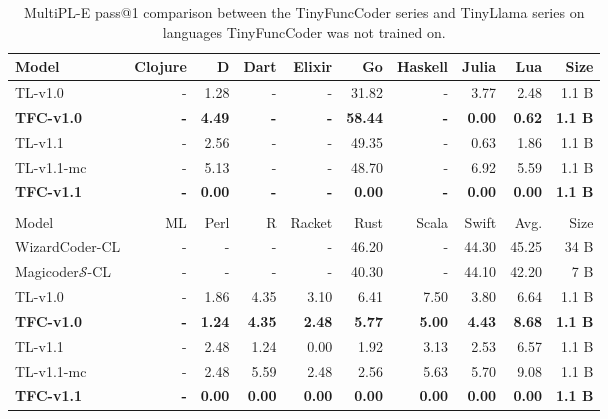 \begin{table}[!h]
    \centering
    \small
    \caption{MultiPL-E pass@1 comparison between the TinyFuncCoder series and TinyLlama series on languages TinyFuncCoder was not trained on.}
    \begin{tabular}{l|rrrrrrrr|r}
        \hline
        Model & Clojure & D & Dart & Elixir & Go & Haskell & Julia & Lua & Size \\
        \hline
        TL-v1.0 & - & 1.28 & - & - & 31.82 & - & 3.77 & 2.48 & 1.1 B\\
        \textbf{TFC-v1.0} & \textbf{-} & \textbf{4.49} & \textbf{-} & \textbf{-} & \textbf{58.44} & \textbf{-} & \textbf{0.00} & \textbf{0.62} & \textbf{1.1 B} \\
        TL-v1.1 & - & 2.56 & - & - & 49.35 & - & 0.63 & 1.86 & 1.1 B \\
        TL-v1.1-mc & - & 5.13 & - & - & 48.70 & - & 6.92 & 5.59 & 1.1 B \\
        \textbf{TFC-v1.1} & \textbf{-} & \textbf{0.00} & \textbf{-} & \textbf{-} & \textbf{0.00} & \textbf{-} & \textbf{0.00} & \textbf{0.00} & \textbf{1.1 B} \\
        &&&&&&&&\\
        \hline
        Model & ML & Perl & R & Racket & Rust & Scala & Swift & Avg. & Size \\
        \hline
        WizardCoder-CL & - & - & - & - & 46.20 & - & 44.30 & 45.25 & 34 B \\
        Magicoder$\mathcal{S}$-CL & - & - & - & - & 40.30 & - & 44.10 & 42.20 & 7 B \\
        \hline
        TL-v1.0 & - & 1.86 & 4.35 & 3.10 & 6.41 & 7.50 & 3.80 & 6.64 & 1.1 B \\
        \textbf{TFC-v1.0} & \textbf{-} & \textbf{1.24} & \textbf{4.35} & \textbf{2.48} & \textbf{5.77} & \textbf{5.00} & \textbf{4.43} & \textbf{8.68} & \textbf{1.1 B} \\
        TL-v1.1 & - & 2.48 & 1.24 & 0.00 & 1.92 & 3.13 & 2.53 & 6.57 & 1.1 B \\
        TL-v1.1-mc & - & 2.48 & 5.59 & 2.48 & 2.56 & 5.63 & 5.70 & 9.08 & 1.1 B \\
        \textbf{TFC-v1.1} & \textbf{-} & \textbf{0.00} & \textbf{0.00} & \textbf{0.00} & \textbf{0.00} & \textbf{0.00} & \textbf{0.00} & \textbf{0.00} & \textbf{1.1 B} \\
        \hline
    \end{tabular}
    \label{tab:multipleother}
\end{table}

